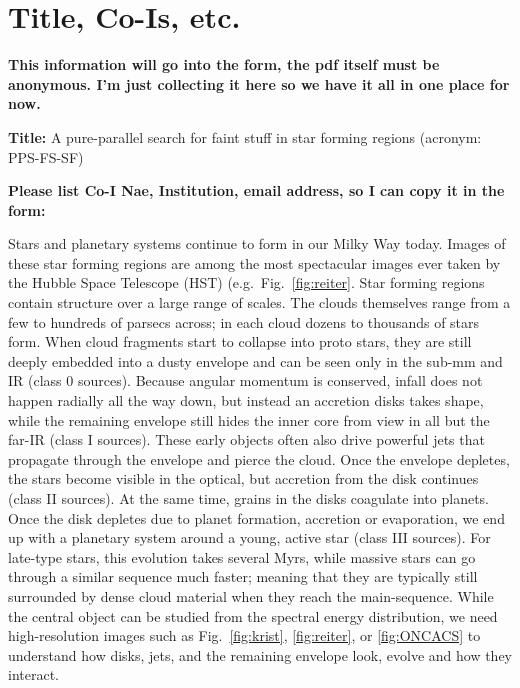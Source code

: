 \documentclass[12pt]{article}
\begin{document}
\section*{Title, Co-Is, etc.}
\textbf{This information will go into the form, the pdf itself must be anonymous. I'm just collecting it here so we have it all in one place for now.}

\textbf{Title:} A pure-parallel search for faint stuff in star forming regions
(acronym: PPS-FS-SF)

\textbf{Please list Co-I Nae, Institution, email address, so I can copy it in the form:}

\pagebreak
%
%
\justification          %
Stars and planetary systems continue to form in our Milky Way today. Images of
these star forming regions are among the most spectacular images ever taken by
the Hubble Space Telescope (HST) (e.g.\ Fig.~\ref{fig:reiter}. Star forming
regions contain structure over a large range of scales. The clouds themselves
range from a few to hundreds of parsecs across; in each cloud dozens to
thousands of stars form. 
When cloud fragments start to collapse into proto stars, they are still deeply
embedded into a dusty envelope and can be seen only in the sub-mm and IR (class
0 sources). Because angular momentum is conserved, infall does not happen
radially all the way down, but instead an accretion disks takes shape, while
the remaining envelope still hides the inner core from view in all but the
far-IR (class I sources).  These early objects often also drive powerful jets
that propagate through the envelope and pierce the cloud. Once the envelope
depletes, the stars become visible in the optical, but accretion from the disk
continues (class II sources). At the same time, grains in the disks coagulate
into planets. Once the disk depletes due to planet formation, accretion or
evaporation, we end up with a planetary system around a young, active star
(class III sources). For late-type stars, this evolution takes several Myrs,
while massive stars can go through a similar sequence much faster; meaning that
they are typically still surrounded by dense cloud material when they reach the main-sequence.
While the central object can be studied from the spectral energy distribution,
we need high-resolution images such as Fig.~\ref{fig:krist}, \ref{fig:reiter},
or \ref{fig:ONCACS} to understand how disks, jets, and the remaining envelope
look, evolve and how they interact.
\end{document}
